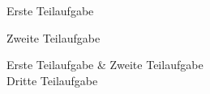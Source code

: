 \begin{multiexelist}
  \item Erste Teilaufgabe 
  \item Zweite Teilaufgabe 
\end{multiexelist}

\begin{multiexearray}{2}
  Erste Teilaufgabe   & Zweite Teilaufgabe  \\
  Dritte Teilaufgabe  \\
\end{multiexearray}
